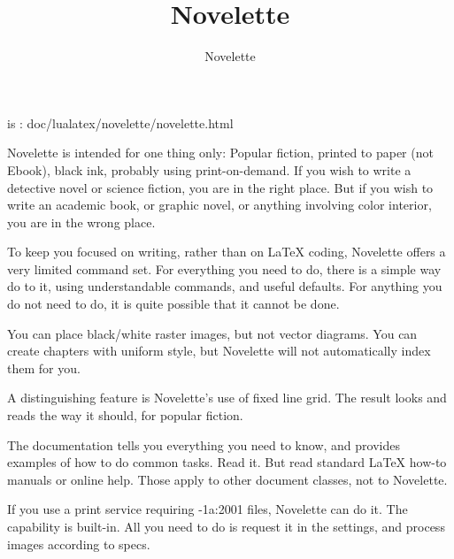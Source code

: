 \documentclass{novelette} %
\title{Novelette}
\author{Novelette}
\begin{document}
\mainmatter
\begin{opening}
\null\null
{}
\null\null
\end{opening}
 is :
doc/lualatex/novelette/novelette.html\par
\scene{-}
Novelette is intended for one thing only: Popular fiction, printed to paper
(not Ebook), black ink, probably using print-on-demand. If you wish to write
a detective novel or science fiction, you are in the right place. But if
you wish to write an academic book, or graphic novel, or anything involving
color interior, you are in the wrong place.

To keep you focused on writing, rather than on LaTeX coding, Novelette offers
a very limited command set. For everything you need to do, there is a simple
way do to it, using understandable commands, and useful defaults. For anything
you do not need to do, it is quite possible that it cannot be done.

You can place black/white raster images, but not vector diagrams. You can
create chapters with uniform style, but Novelette will not automatically
index them for you.

A distinguishing feature is Novelette's use of fixed line grid. The result
looks and reads the way it should, for popular fiction.

The  documentation tells you everything you need to know,
and provides examples of how to do common tasks. Read it. But 
read standard LaTeX how-to manuals or online help. Those apply to other
document classes, not to Novelette.

If you use a print service requiring -1a:2001 files, Novelette
can do it. The capability is built-in. All you need to do is request it in the
settings, and process images according to specs.
\end{document}
